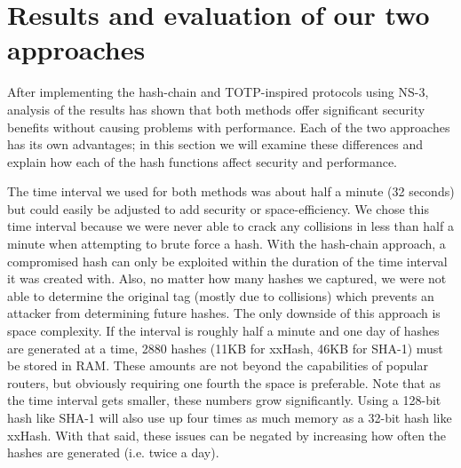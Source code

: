 \documentclass[12pt]{article} %
\begin{document}

\newpage %



\section{Results and evaluation of our two approaches}

After implementing the hash-chain and TOTP-inspired protocols using NS-3, analysis of the results has shown that both methods offer significant security benefits without causing problems with performance. Each of the two approaches has its own advantages; in this section we will examine these differences and explain how each of the hash functions affect security and performance.

The time interval we used for both methods was about half a minute (32 seconds) but could easily be adjusted to add security or space-efficiency. We chose this time interval because we were never able to crack any collisions in less than half a minute when attempting to brute force a hash. With the hash-chain approach, a compromised hash can only be exploited within the duration of the time interval it was created with. Also, no matter how many hashes we captured, we were not able to determine the original tag (mostly due to collisions) which prevents an attacker from determining future hashes. The only downside of this approach is space complexity. If the interval is roughly half a minute and one day of hashes are generated at a time, 2880 hashes (11KB for xxHash, 46KB for SHA-1) must be stored in RAM. These amounts are not beyond the capabilities of popular routers, but obviously requiring one fourth the space is preferable. Note that as the time interval gets smaller, these numbers grow significantly. Using a 128-bit hash like SHA-1 will also use up four times as much memory as a 32-bit hash like xxHash. With that said, these issues can be negated by increasing how often the hashes are generated (i.e. twice a day).
\end{document}
